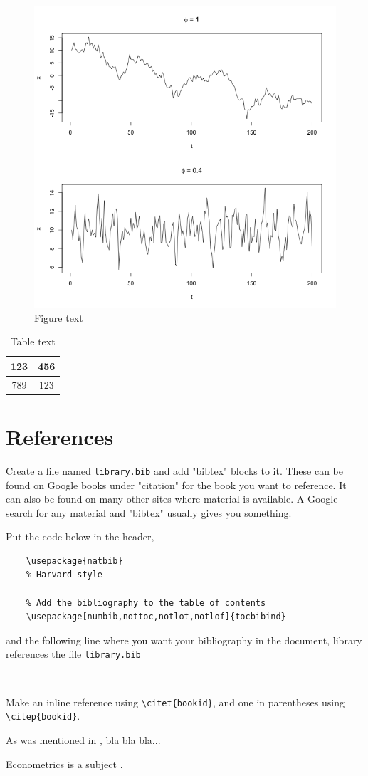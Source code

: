 \documentclass[a4paper]{article}
\begin{document}
\begin{figure}
	\centering
	\includegraphics[scale=0.3]{./image}
	\caption{Figure text}
	\label{fig:figure1}
\end{figure}

\begin{table}[!htbp] \centering
	\caption{Table text} 
	\label{table:table1}
	\vspace{5mm}
	\begin{tabular}{|c|c|}
		\hline
		123&456  \\
		\hline
		789&123  \\
		\hline
	\end{tabular}
\end{table}

\newpage
\section{References}
Create a file named \verb*|library.bib| and add "bibtex" blocks to it. These can be found on Google books under "citation" for the book you want to reference. It can also be found on many other sites where material is available. A Google search for any material and "bibtex" usually gives you something.

Put the code below in the header,
\begin{verbatim}
	\usepackage{natbib}
	% Harvard style
	
	% Add the bibliography to the table of contents
	\usepackage[numbib,nottoc,notlot,notlof]{tocbibind}
\end{verbatim}
and the following line where you want your bibliography in the document, library references the file \verb*|library.bib|
\begin{verbatim}
	
\end{verbatim}

Make an inline reference using \verb*|\citet{bookid}|, and one in parentheses using \verb*|\citep{bookid}|.

As was mentioned in \citet{wonnacott1979econometrics}, bla bla bla...

Econometrics is a subject \citep{wonnacott1979econometrics}.


\end{document}
